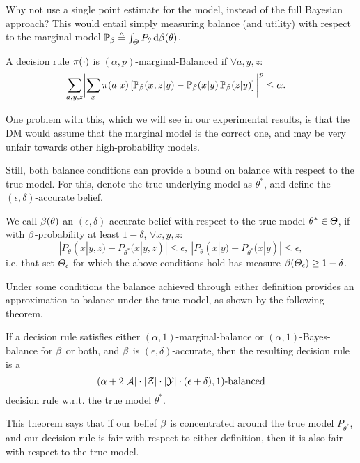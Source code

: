 Why not use a single point estimate for the model, instead of the full Bayesian approach? This would entail simply measuring balance (and utility) with respect to the marginal model
$\mathop{\mbox{\ensuremath{\mathbb{P}}}}\nolimits_\beta \mathrel{\triangleq} \int_\Theta P_\theta \,\mathrm{d} \beta(\theta)$.
\begin{definition}
A decision rule $\pi(\cdot)$ is $(\alpha,p)$-marginal-Balanced if  $\forall a, y,  z$:
\begin{align}
  \sum_{a, y, z}  \biggl |\sum_x \pi(a | x)
    \left[\mathop{\mbox{\ensuremath{\mathbb{P}}}}\nolimits_\beta(x, z | y)
    - \mathop{\mbox{\ensuremath{\mathbb{P}}}}\nolimits_\beta(x | y) \mathop{\mbox{\ensuremath{\mathbb{P}}}}\nolimits_\beta(z | y) \right]\biggl|^p &\leq \alpha.
  \label{eq:marginal-balance}
\end{align}
\label{def:marginal-balance}
\end{definition}

One problem with this, which we will see in our experimental results,
is that the DM would assume that the marginal model is the correct one, and
may be very unfair towards other high-probability models.

Still, both balance conditions can provide a bound on balance with respect
to the true model.
For this, denote the true underlying model as $\theta^*$, and define the $(\epsilon,\delta)$-accurate belief.
%
\begin{definition}
  We call $\beta(\theta)$ an $(\epsilon,\delta)$-accurate belief with respect to the true model $\theta^* \in \Theta$, if with $\beta$-probability at least $1-\delta$, $\forall x,y,z$: $$|P_{\theta}(x|y,z) -P_{\theta^*}(x|y,z)| \leq \epsilon,~| P_{\theta}(x|y)-P_{\theta^*}(x|y)| \leq \epsilon,$$  i.e. that set $\Theta_\epsilon$ for which the above conditions hold has measure $\beta(\Theta_\epsilon) \geq 1 - \delta$.
\end{definition}

Under some conditions the balance achieved through either definition
provides an approximation to balance
under the true model, as shown by the following theorem.
%
\begin{theorem}\label{noise:model}
  If a decision rule satisfies either $(\alpha,1)$-marginal-balance or $(\alpha,1)$-Bayes-balance for $\beta$ or both, and $\beta$ is $(\epsilon,\delta)$-accurate, then the resulting decision rule is a $$(\alpha+2|\mathcal{A}| \cdot |\mathcal{Z}| \cdot |\mathcal{Y}|\cdot(\epsilon+\delta),1) \text{-balanced}$$ decision rule w.r.t. the true model $\theta^*$.
\end{theorem}

This theorem says that if our belief $\beta$ is concentrated around the
true model $P_{\theta^*}$, and our decision rule is fair with respect
to either definition, then it is also fair with respect to the true
model.





